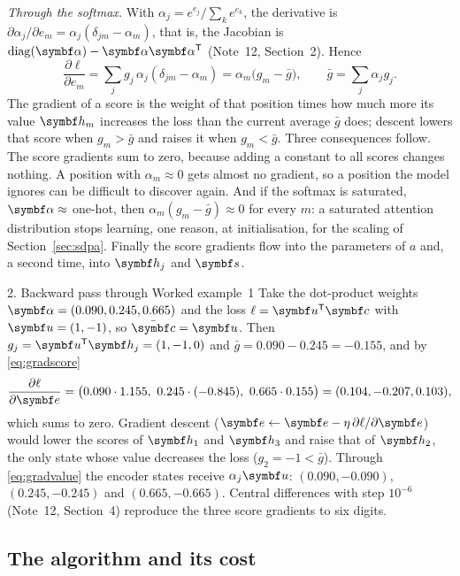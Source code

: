 \documentclass[11pt]{article}
\newcommand{\hv}{\vect{h}}
\newcommand{\sv}{\vect{s}}
\newcommand{\cv}{\vect{c}}
\newcommand{\ev}{\vect{e}}
\newcommand{\uv}{\vect{u}}
\newcommand{\valpha}{\vect{\alpha}}
\newcommand{\diag}{\operatorname{diag}}
\begin{document}
\emph{Through the softmax.} With $\alpha_j = e^{e_j}/\sum_k e^{e_k}$, the derivative is $\partial\alpha_j/\partial e_m =
\alpha_j(\delta_{jm} - \alpha_m)$, that is, the Jacobian is $\diag(\valpha) - \valpha\valpha\T$ (Note~12, Section~2). Hence
\begin{equation}\label{eq:gradscore}
  \frac{\partial\ell}{\partial e_m} = \sum_j g_j\,\alpha_j(\delta_{jm} - \alpha_m) = \alpha_m\big(g_m - \bar g\big),
  \qquad \bar g = \sum_j \alpha_j g_j .
\end{equation}
The gradient of a score is the weight of that position times how much more its value $\hv_m$ increases the loss than the
current average $\bar g$ does; descent lowers that score when $g_m > \bar g$ and raises it when $g_m < \bar g$. Three
consequences follow. The score gradients sum to zero, because adding a constant to all
scores changes nothing. A position with $\alpha_m \approx 0$ gets almost no gradient, so a position the model ignores
can be difficult to discover again. And if the softmax is saturated, $\valpha \approx$ one-hot, then $\alpha_m(g_m - \bar g)
\approx 0$ for every $m$: a saturated attention distribution stops learning, one reason, at initialisation, for the scaling
of Section~\ref{sec:sdpa}. Finally the score gradients flow into the parameters of $a$ and, a second time, into $\hv_j$ and $\sv$.

\begin{worked}{2. Backward pass through Worked example~1}
Take the dot-product weights $\valpha = (0.090, 0.245, 0.665)$ and the loss $\ell = \uv\T\cv$ with $\uv = (1, -1)$, so
$\bar{\cv} = \uv$. Then $g_j = \uv\T\hv_j = (1, -1, 0)$ and $\bar g = 0.090 - 0.245 = -0.155$, and by \eqref{eq:gradscore}
\[
  \frac{\partial\ell}{\partial\ev} = \big(0.090 \cdot 1.155,\ 0.245 \cdot (-0.845),\ 0.665 \cdot 0.155\big)
  = (0.104, -0.207, 0.103) ,
\]
which sums to zero. Gradient descent ($\ev \gets \ev - \eta\,\partial\ell/\partial\ev$) would lower the scores of $\hv_1$
and $\hv_3$ and raise that of $\hv_2$, the only state whose value decreases the loss ($g_2 = -1 < \bar g$). Through \eqref{eq:gradvalue} the encoder states receive $\alpha_j\uv$: $(0.090, -0.090)$,
$(0.245, -0.245)$ and $(0.665, -0.665)$. Central differences with step $10^{-6}$ (Note~12, Section~4) reproduce the three
score gradients to six digits.
\end{worked}

\subsection{The algorithm and its cost}\label{sec:attalg}
\end{document}
